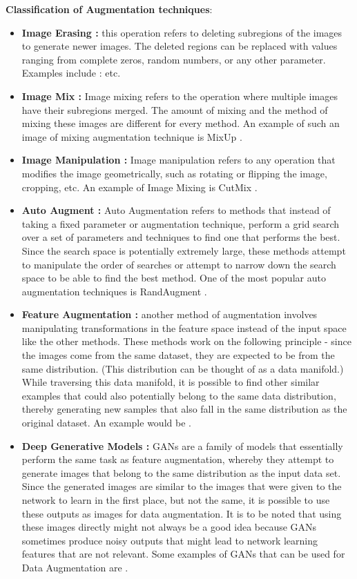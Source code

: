 \textbf{Classification of Augmentation techniques}:
\begin{itemize}
\item \textbf{Image Erasing :} this operation refers to deleting subregions of the images to generate newer images. The deleted regions can be replaced with values ranging from complete zeros, random numbers, or any other parameter. Examples include : \cite{zhongRandomErasingData2020,chenGridMaskDataAugmentation2020,singhHideandSeekDataAugmentation2018} etc.
\item \textbf{Image Mix :} Image mixing refers to the operation where multiple images have their subregions merged. The amount of mixing and the method of mixing these images are different for every method. An example of such an image of mixing augmentation technique is MixUp \cite{zhangMixupEmpiricalRisk2018}.
\item \textbf{Image Manipulation :} Image manipulation refers to any operation that modifies the image geometrically, such as rotating or flipping the image, cropping, etc. An example of Image Mixing is CutMix \cite{yunCutMixRegularizationStrategy2019a}.
\item \textbf{Auto Augment :} Auto Augmentation refers to methods that instead of taking a fixed parameter or augmentation technique, perform a grid search over a set of parameters and techniques to find one that performs the best. Since the search space is potentially extremely large, these methods attempt to manipulate the order of searches or attempt to narrow down the search space to be able to find the best method. One of the most popular auto augmentation techniques is RandAugment \cite{cubukRandaugmentPracticalAutomated2020}.
\item \textbf{Feature Augmentation :} another method of augmentation involves manipulating transformations in the feature space instead of the input space like the other methods. These methods work on the following principle - since the images come from the same dataset, they are expected to be from the same distribution. (This distribution can be thought of as a data manifold.) While traversing this data manifold, it is possible to find other similar examples that could also potentially belong to the same data distribution, thereby generating new samples that also fall in the same distribution as the original dataset. An example would be \cite{devriesImprovedRegularizationConvolutional2017}.
\item \textbf{Deep Generative Models :} GANs are a family of models that essentially perform the same task as feature augmentation, whereby they attempt to generate images that belong to the same distribution as the input data set. Since the generated images are similar to the images that were given to the network to learn in the first place, but not the same, it is possible to use these outputs as images for data augmentation. It is to be noted that using these images directly might not always be a good idea because GANs sometimes produce noisy outputs that might lead to network learning features that are not relevant. Some examples of GANs that can be used for Data Augmentation are \cite{choiStarGANV2Diverse2020,isolaImagetoImageTranslationConditional2018}.
\end{itemize}

